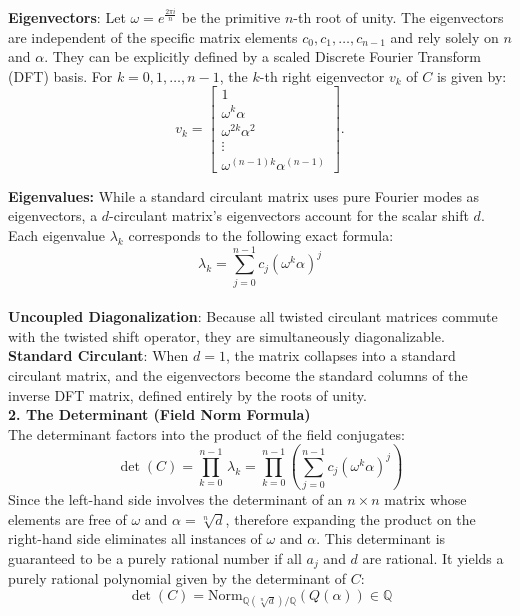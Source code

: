 {\bf Eigenvectors}:
Let \(\omega = e^{\frac{2\pi i}{n}}\) be the primitive \(n\)-th root of unity.
The eigenvectors are independent of the specific matrix elements \(c_0, c_1, \dots, c_{n-1}\) and rely solely on \(n\) and \( \alpha \).
They can be explicitly defined by a scaled Discrete Fourier Transform (DFT) basis.
For \(k = 0, 1, \dots, n-1\), the \(k\)-th right eigenvector \(v_{k}\) of \(C\) is given by:
\[v_k = \begin{bmatrix}  1 \\  \omega^{k} \alpha  \\  \omega^{2k} \alpha^{2} \\  \vdots \\  \omega^{(n-1)k} \alpha^{(n-1)}  \end{bmatrix}. \]

{\bf Eigenvalues:} While a standard circulant matrix uses pure Fourier modes as eigenvectors, a $d$-circulant matrix's eigenvectors account for the scalar shift $d$. 
Each eigenvalue \(\lambda _{k}\) corresponds to the following exact formula:  
\[ \lambda_k = \sum_{j=0}^{n-1} c_j \left(\omega^k \alpha \right)^j \] \\

{\bf Uncoupled Diagonalization}: Because all twisted circulant matrices commute with the twisted shift operator, they are simultaneously diagonalizable. \\

{\bf Standard Circulant}: When \(d = 1\), the matrix collapses into a standard circulant matrix, and the eigenvectors become the standard columns of the inverse DFT matrix, 
defined entirely by the roots of unity.\\

{\bf 2. The Determinant (Field Norm Formula)} \\

The determinant factors into the product of the field conjugates:
\[\det (C)= \prod_{k=0}^{n-1}\, \lambda_k  =  \prod _{k=0}^{n-1}\left(\sum _{j=0}^{n-1}c_{j} \left(\omega^{k} \alpha \right)^{j}\right)\]
Since the left-hand side involves the determinant of an $n \times n$ matrix whose elements are free of \(\omega \) and \(\alpha  =  \sqrt[n]{d} \), therefore expanding the product on the right-hand side eliminates all instances of \(\omega \) and \(\alpha  \).
This determinant is guaranteed to be a purely rational number if all \(a_{j}\) and $d$ are rational. 
It yields a purely rational polynomial given by the determinant of $C$:
\[\det (C)=\text{Norm}_{\mathbb{Q}(\sqrt[n]{d})/\mathbb{Q}}(Q(\alpha ))\in \mathbb{Q}\] 

